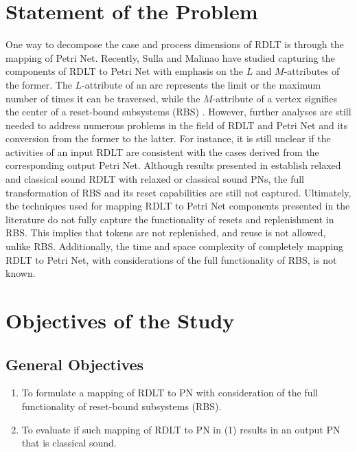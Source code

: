 \documentclass[12pt]{article}
\begin{document}
    \section{Statement of the Problem}
    One way to decompose the case and process dimensions of RDLT is through the mapping of Petri Net. Recently, Sulla and Malinao \cite{sulla-malinao} have studied capturing the components of RDLT to Petri Net with emphasis on the $L$ and $M$-attributes of the former. The $L$-attribute of an arc represents the limit or the maximum number of times it can be traversed, while the $M$-attribute of a vertex signifies the center of a reset-bound subsystems (RBS) \cite{sulla-malinao}. However, further analyses are still needed to address numerous problems in the field of RDLT and Petri Net and its conversion from the former to the latter. For instance, it is still unclear if the activities of an input RDLT are consistent with the cases derived from the corresponding output Petri Net. Although results presented in \cite{sulla-malinao} establish relaxed and classical sound RDLT with relaxed or classical sound PNs, the full transformation of RBS and its reset capabilities are still not captured. Ultimately, the techniques used for mapping RDLT to Petri Net components presented in the literature do not fully capture the functionality of resets and replenishment in RBS. This implies that tokens are not replenished, and reuse is not allowed, unlike RBS. Additionally, the time and space complexity of completely mapping RDLT to Petri Net, with considerations of the full functionality of RBS, is not known.


    \section{Objectives of the Study}
    \subsection{General Objectives}
    \begin{enumerate}
        \item To formulate a mapping of RDLT to PN with consideration of the full functionality of reset-bound subsystems (RBS).
        \item To evaluate if such mapping of RDLT to PN in (1) results in an output PN that is classical sound.
    \end{enumerate}
\end{document}
